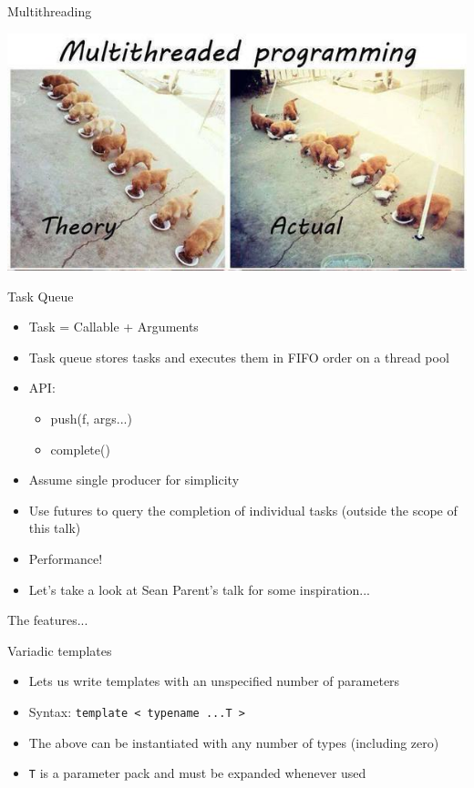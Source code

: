 \documentclass{beamer}
\begin{document}
\begin{frame}{Multithreading}
\begin{center}
\includegraphics[width=0.8\linewidth]{concurrency.jpeg}
\end{center}
\end{frame}

\begin{frame}{Task Queue}
\begin{itemize}
\item Task = Callable + Arguments
\item Task queue stores tasks and executes them in FIFO order on a thread pool
\item API:
\begin{itemize}
\item push(f, args...)
\item complete()
\end{itemize}
\item Assume single producer for simplicity
\item Use futures to query the completion of individual tasks (outside the scope of this talk)
\item Performance!
\item Let's take a look at Sean Parent's talk for some inspiration...
\end{itemize}
\end{frame}

\begin{frame}[standout]
The features...
\end{frame}

\begin{frame}{Variadic templates}
\begin{itemize}
\item Lets us write templates with an unspecified number of parameters
\item Syntax: \texttt{template < typename ...T >}
\item The above can be instantiated with any number of types (including zero)
\item \texttt{T} is a parameter pack and must be expanded whenever used
\end{itemize}
\end{frame}
\end{document}
